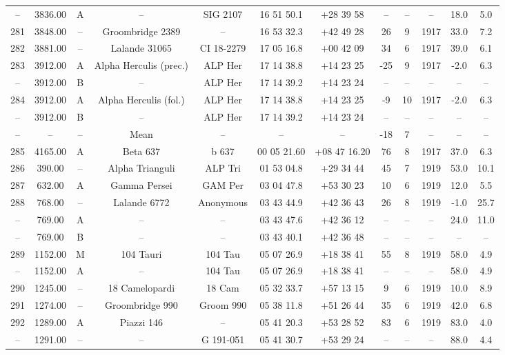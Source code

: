 \begin{table}
\begin{tabular}{cccccccccccc}
-- & 3836.00 & A & -- & SIG 2107 & 16 51 50.1 & +28 39 58 & -- & -- & -- & 18.0 & 5.0 \\
281 & 3848.00 & -- & Groombridge 2389 & -- & 16 53 32.3 & +42 49 28 & 26 & 9 & 1917 & 33.0 & 7.2 \\
282 & 3881.00 & -- & Lalande 31065 & CI 18-2279 & 17 05 16.8 & +00 42 09 & 34 & 6 & 1917 & 39.0 & 6.1 \\
283 & 3912.00 & A & Alpha Herculis (prec.) & ALP Her & 17 14 38.8 & +14 23 25 & -25 & 9 & 1917 & -2.0 & 6.3 \\
-- & 3912.00 & B & -- & ALP Her & 17 14 39.2 & +14 23 24 & -- & -- & -- & -- & -- \\
284 & 3912.00 & A & Alpha Herculis (fol.) & ALP Her & 17 14 38.8 & +14 23 25 & -9 & 10 & 1917 & -2.0 & 6.3 \\
-- & 3912.00 & B & -- & ALP Her & 17 14 39.2 & +14 23 24 & -- & -- & -- & -- & -- \\
-- & -- & -- & Mean & -- & -- & -- & -18 & 7 & -- & -- & -- \\
285 & 4165.00 & A & Beta 637 & b 637 & 00 05 21.60 & +08 47 16.20 & 76 & 8 & 1917 & 37.0 & 6.3 \\
286 & 390.00 & -- & Alpha Trianguli & ALP Tri & 01 53 04.8 & +29 34 44 & 45 & 7 & 1919 & 53.0 & 10.1 \\
287 & 632.00 & A & Gamma Persei & GAM Per & 03 04 47.8 & +53 30 23 & 10 & 6 & 1919 & 12.0 & 5.5 \\
288 & 768.00 & -- & Lalande 6772 & Anonymous & 03 43 44.9 & +42 36 43 & 26 & 8 & 1919 & -1.0 & 25.7 \\
-- & 769.00 & A & -- & -- & 03 43 47.6 & +42 36 12 & -- & -- & -- & 24.0 & 11.0 \\
-- & 769.00 & B & -- & -- & 03 43 40.1 & +42 36 48 & -- & -- & -- & -- & -- \\
289 & 1152.00 & M & 104 Tauri & 104 Tau & 05 07 26.9 & +18 38 41 & 55 & 8 & 1919 & 58.0 & 4.9 \\
-- & 1152.00 & A & -- & 104 Tau & 05 07 26.9 & +18 38 41 & -- & -- & -- & 58.0 & 4.9 \\
290 & 1245.00 & -- & 18 Camelopardi & 18 Cam & 05 32 33.7 & +57 13 15 & 9 & 6 & 1919 & 10.0 & 8.9 \\
291 & 1274.00 & -- & Groombridge 990 & Groom 990 & 05 38 11.8 & +51 26 44 & 35 & 6 & 1919 & 42.0 & 6.8 \\
292 & 1289.00 & A & Piazzi 146 & -- & 05 41 20.3 & +53 28 52 & 83 & 6 & 1919 & 83.0 & 4.0 \\
-- & 1291.00 & -- & -- & G 191-051 & 05 41 30.7 & +53 29 24 & -- & -- & -- & 88.0 & 4.4 \\

\end{tabular}
\end{table}
